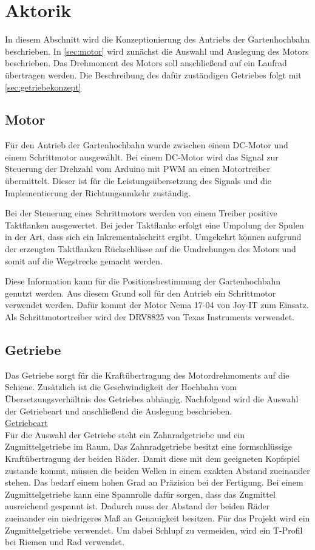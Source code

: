 \section{Aktorik}
In diesem Abschnitt wird die Konzeptionierung des Antriebs der Gartenhochbahn beschrieben. In \autoref{sec:motor} wird zunächst die Auswahl und Auslegung des Motors beschrieben. Das Drehmoment des Motors soll anschließend auf ein Laufrad übertragen werden. Die Beschreibung des dafür zuständigen Getriebes folgt mit \autoref{sec:getriebekonzept}

\subsection{Motor}
\label{sec:motor}
Für den Antrieb der Gartenhochbahn wurde zwischen einem DC-Motor und einem Schrittmotor ausgewählt. 
Bei einem DC-Motor wird das Signal zur Steuerung der Drehzahl vom Arduino mit PWM an einen Motortreiber übermittelt. Dieser ist für die Leistungsübersetzung des Signals und die Implementierung der Richtungsumkehr zuständig. 

Bei der Steuerung eines Schrittmotors werden von einem Treiber positive Taktflanken ausgewertet. Bei jeder Taktflanke erfolgt eine Umpolung der Spulen in der Art, dass sich ein Inkrementalschritt ergibt. Umgekehrt können aufgrund der erzeugten Taktflanken Rückschlüsse auf die Umdrehungen des Motors und somit auf die Wegstrecke gemacht werden. 

Diese Information kann für die Positionsbestimmung der Gartenhochbahn genutzt werden. Aus diesem Grund soll für den Antrieb ein Schrittmotor verwendet werden. Dafür kommt der Motor Nema 17-04 von Joy-IT zum Einsatz. Als Schrittmotortreiber wird der DRV8825 von Texas Instruments verwendet. 



\subsection{Getriebe}
\label{sec:getriebekonzept}
Das Getriebe sorgt für die Kraftübertragung des Motordrehmoments auf die Schiene. Zusätzlich ist die Geschwindigkeit der Hochbahn vom Übersetzungsverhältnis des Getriebes abhängig. Nachfolgend wird die Auswahl der Getriebeart und anschließend die Auslegung beschrieben. \\

\underline{Getriebeart}\\
Für die Auswahl der Getriebe steht ein Zahnradgetriebe und ein Zugmittelgetriebe im Raum. Das Zahnradgetriebe besitzt eine formschlüssige Kraftübertragung der beiden Räder. Damit diese mit dem geeigneten Kopfspiel zustande kommt, müssen die beiden Wellen in einem exakten Abstand zueinander stehen. Das bedarf einem hohen Grad an Präzision bei der Fertigung. Bei einem Zugmittelgetriebe kann eine Spannrolle dafür sorgen, dass das Zugmittel ausreichend gespannt ist. Dadurch muss der Abstand der beiden Räder zueinander ein niedrigeres Maß an Genauigkeit besitzen. 
Für das Projekt wird ein Zugmittelgetriebe verwendet. Um dabei Schlupf zu vermeiden, wird ein T-Profil bei Riemen und Rad verwendet. 
\\


